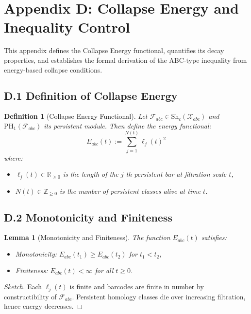 \documentclass[11pt]{article}
\newtheorem{definition}[theorem]{Definition}
\newtheorem{lemma}[theorem]{Lemma}
\begin{document}
\section*{Appendix D: Collapse Energy and Inequality Control}

This appendix defines the Collapse Energy functional, quantifies its decay properties,  
and establishes the formal derivation of the ABC-type inequality from energy-based collapse conditions.

\subsection*{D.1 Definition of Collapse Energy}

\begin{definition}[Collapse Energy Functional]
Let \( \mathcal{F}_{abc} \in \mathrm{Sh}_c(\mathcal{X}_{abc}) \) and \( \mathrm{PH}_1(\mathcal{F}_{abc}) \) its persistent module.  
Then define the energy functional:
\[
E_{abc}(t) := \sum_{j=1}^{N(t)} \ell_j(t)^2
\]
where:
\begin{itemize}
  \item \( \ell_j(t) \in \mathbb{R}_{\geq 0} \) is the length of the \( j \)-th persistent bar at filtration scale \( t \),
  \item \( N(t) \in \mathbb{Z}_{\geq 0} \) is the number of persistent classes alive at time \( t \).
\end{itemize}
\end{definition}

\subsection*{D.2 Monotonicity and Finiteness}

\begin{lemma}[Monotonicity and Finiteness]
The function \( E_{abc}(t) \) satisfies:
\begin{itemize}
  \item Monotonicity: \( E_{abc}(t_1) \geq E_{abc}(t_2) \) for \( t_1 < t_2 \),
  \item Finiteness: \( E_{abc}(t) < \infty \) for all \( t \geq 0 \).
\end{itemize}
\end{lemma}

\begin{proof}[Sketch]
Each \( \ell_j(t) \) is finite and barcodes are finite in number by constructibility of \( \mathcal{F}_{abc} \).  
Persistent homology classes die over increasing filtration, hence energy decreases.
\end{proof}
\end{document}
